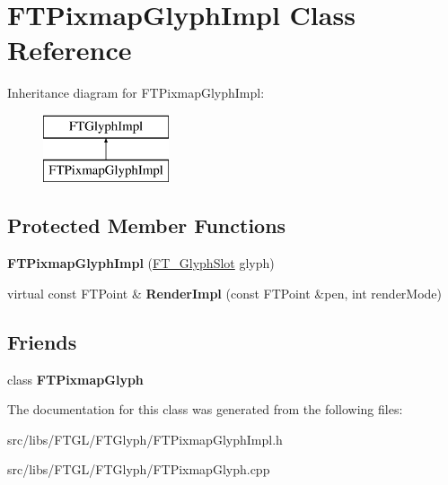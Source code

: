 \hypertarget{class_f_t_pixmap_glyph_impl}{
\section{FTPixmapGlyphImpl Class Reference}
\label{class_f_t_pixmap_glyph_impl}
}
Inheritance diagram for FTPixmapGlyphImpl:\begin{figure}[H]
\begin{center}
\leavevmode
\includegraphics[height=2.000000cm]{class_f_t_pixmap_glyph_impl}
\end{center}
\end{figure}
\subsection*{Protected Member Functions}
\begin{DoxyCompactItemize}
\item 
\hypertarget{class_f_t_pixmap_glyph_impl_a65e1773b7c1f422abbccd90399cd3ec4}{
{\bfseries FTPixmapGlyphImpl} (\hyperlink{struct_f_t___glyph_slot_rec__}{FT\_\-GlyphSlot} glyph)}
\label{class_f_t_pixmap_glyph_impl_a65e1773b7c1f422abbccd90399cd3ec4}

\item 
\hypertarget{class_f_t_pixmap_glyph_impl_a9c5cf9105b59301f0b27cfa2350012c6}{
virtual const FTPoint \& {\bfseries RenderImpl} (const FTPoint \&pen, int renderMode)}
\label{class_f_t_pixmap_glyph_impl_a9c5cf9105b59301f0b27cfa2350012c6}

\end{DoxyCompactItemize}
\subsection*{Friends}
\begin{DoxyCompactItemize}
\item 
\hypertarget{class_f_t_pixmap_glyph_impl_ab141fccf761e39b9e4bec64cda0507a7}{
class {\bfseries FTPixmapGlyph}}
\label{class_f_t_pixmap_glyph_impl_ab141fccf761e39b9e4bec64cda0507a7}

\end{DoxyCompactItemize}


The documentation for this class was generated from the following files:\begin{DoxyCompactItemize}
\item 
src/libs/FTGL/FTGlyph/FTPixmapGlyphImpl.h\item 
src/libs/FTGL/FTGlyph/FTPixmapGlyph.cpp\end{DoxyCompactItemize}
